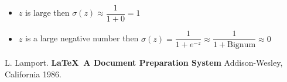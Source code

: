 \documentclass[12pt,reqno]{book}      %
\begin{document}
\begin{itemize}
	\item $z$ is large then $\sigma(z) \approx \dfrac{1}{1 + 0} = 1$
    \item $z$ is a large negative number then $\sigma(z) = \dfrac{1}{1 + e^{-z}} \approx \dfrac{1}{1 + \text{Bignum}} \approx 0$
\end{itemize}

\pagestyle{headings}




\begin{thebibliography}{99}
 L. Lamport. {\bf \LaTeX \ A Document Preparation System}
Addison-Wesley, California 1986.
\end{thebibliography}


\end{document}
